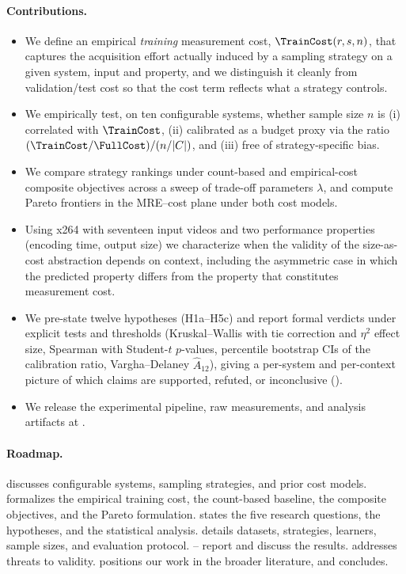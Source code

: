 \paragraph*{Contributions.}
\begin{itemize}
    \item We define an empirical \emph{training} measurement cost,
    $\TrainCost(r,s,n)$, that captures the acquisition effort actually induced
    by a sampling strategy on a given system, input and property, and we
    distinguish it cleanly from validation/test cost so that the cost term
    reflects what a strategy controls.
    \item We empirically test, on ten configurable systems, whether sample size
    $n$ is (i) correlated with $\TrainCost$, (ii) calibrated as a budget proxy
    via the ratio $(\TrainCost/\FullCost)/(n/|C|)$, and (iii) free of
    strategy-specific bias.
    \item We compare strategy rankings under count-based and empirical-cost
    composite objectives across a sweep of trade-off parameters $\lambda$, and
    compute Pareto frontiers in the MRE--cost plane under both cost models.
    \item Using x264 with seventeen input videos and two performance properties
    (encoding time, output size) we characterize when the validity of the
    size-as-cost abstraction depends on context, including the asymmetric case
    in which the predicted property differs from the property that constitutes
    measurement cost.
    \item We pre-state twelve hypotheses (H1a--H5c) and report formal
    verdicts under explicit tests and thresholds (Kruskal--Wallis with tie
    correction and $\eta^2$ effect size, Spearman with Student-$t$
    $p$-values, percentile bootstrap CIs of the calibration ratio,
    Vargha--Delaney $\hat A_{12}$), giving a per-system and per-context
    picture of which claims are supported, refuted, or inconclusive
    ().
    \item We release the experimental pipeline, raw measurements, and analysis
    artifacts at .
\end{itemize}

\paragraph*{Roadmap.}
 discusses configurable systems, sampling strategies, and
prior cost models.  formalizes the empirical training
cost, the count-based baseline, the composite objectives, and the Pareto
formulation.  states the five research questions, the
hypotheses, and the statistical analysis.  details
datasets, strategies, learners, sample sizes, and evaluation
protocol. -- report and discuss the
results.  addresses threats to
validity.  positions our work in the broader literature,
and  concludes.
